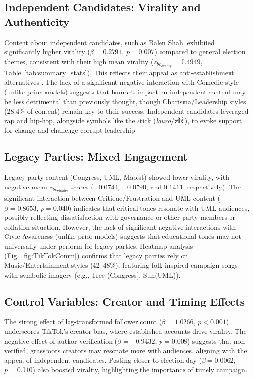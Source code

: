 \documentclass[12pt,a4paper]{report}
\begin{document}
\subsection*{Independent Candidates: Virality and Authenticity}
Content about independent candidates, such as Balen Shah, exhibited significantly higher virality ($\beta = 0.2791$, $p = 0.007$) compared to general election themes, consistent with their high mean virality ($z_{bc_{\text{virality}}} = 0.4949$, Table~\ref{tab:summary_stats}). This reflects their appeal as anti-establishment alternatives \parencite{NepalNews2024}. The lack of a significant negative interaction with Comedic style (unlike prior models) suggests that humor’s impact on independent content may be less detrimental than previously thought, though Charisma/Leadership styles (28.4\% of content) remain key to their success. Independent candidates leveraged rap and hip-hop, alongside symbols like the stick (\textit{lauro}/\texthindi{लौरो}), to evoke support for change and challenge corrupt leadership \parencite{AnnapurnaExpress2022}.
\newpage
\subsection*{Legacy Parties: Mixed Engagement}
Legacy party content (Congress, UML, Maoist) showed lower virality, with negative mean $z_{bc_{\text{virality}}}$ scores ($-0.0740$, $-0.0790$, and $0.1411$, respectively). The significant interaction between Critique/Frustration and UML content ($\beta = 0.8653$, $p = 0.040$) indicates that critical tones resonate with UML audiences, possibly reflecting dissatisfaction with governance or other party members or collation situation. However, the lack of significant negative interactions with Civic Awareness (unlike prior models) suggests that educational tones may not universally under perform for legacy parties. Heatmap analysis (Fig.~\ref{fig:TikTokComm}) confirms that legacy parties rely on Music/Entertainment styles (42--48\%), featuring folk-inspired campaign songs with symbolic imagery (e.g., Tree (Congress), Sun(UML)).

\subsection*{Control Variables: Creator and Timing Effects}
The strong effect of log-transformed follower count ($\beta = 1.0266$, $p < 0.001$) underscores TikTok’s creator bias, where established accounts drive virality. The negative effect of author verification ($\beta = -0.9432$, $p = 0.008$) suggests that non-verified, grassroots creators may resonate more with audiences, aligning with the appeal of independent candidates. Posting closer to election day ($\beta = 0.0062$, $p = 0.010$) also boosted virality, highlighting the importance of timely campaign.
\end{document}
